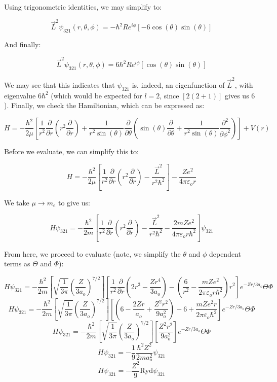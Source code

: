 \begin{enumerate}
    Using trigonometric identities, we may simplify to:

    $$\vec{L}^2\psi_{321}(r,\theta,\phi)=-\hbar^2Re^{i\phi}\left[ -6\cos(\theta)\sin(\theta)\right]$$

    And finally:

    $$\vec{L}^2\psi_{321}(r,\theta,\phi)=6\hbar^2Re^{i\phi}\left[ \cos(\theta)\sin(\theta)\right]$$
    
    We may see that this indicates that $\psi_{321}$ is, indeed, an eigenfunction of $\vec{L}^2$, with eigenvalue $6\hbar^2$ (which would be expected for $l=2$, since $[2(2+1)]$ gives us $6$). Finally, we check the Hamiltonian, which can be expressed as:

    $$H=-\frac{\hbar^2}{2\mu}\left[ \frac{1}{r^2}\frac{\partial}{\partial r}\left( r^2\frac{\partial}{\partial r} \right)+\frac{1}{r^2\sin(\theta)}\frac{\partial}{\partial \theta}\left( \sin(\theta)\frac{\partial}{\partial\theta}+\frac{1}{r^2\sin(\theta)}\frac{\partial^2}{\partial\phi^2} \right) \right] + V(r)$$

    Before we evaluate, we can simplify this to:

    $$H=-\frac{\hbar^2}{2\mu}\left[ \frac{1}{r^2}\frac{\partial}{\partial r}\left( r^2\frac{\partial}{\partial r}\right) -\frac{\vec{L}^2}{r^2\hbar^2}\right]-\frac{Ze^2}{4\pi\varepsilon_or}$$

    We take $\mu\to m_e$ to give us:

    $$H\psi_{321}=-\frac{\hbar^2}{2m}\left[ \frac{1}{r^2}\frac{\partial}{\partial r}\left( r^2\frac{\partial}{\partial r}\right) -\frac{\vec{L}^2}{r^2\hbar^2}-\frac{2mZe^2}{4\pi\varepsilon_or\hbar^2}\right]\psi_{321}$$

    From here, we proceed to evaluate (note, we simplify the $\theta$ and $\phi$ dependent terms as $\Theta$ and $\Phi$):

    $$H\psi_{321}=-\frac{\hbar^2}{2m}\left[ \sqrt{\frac{1}{3\pi}}\left( \frac{Z}{3a_o} \right)^{7/2}\right]\left[ \frac{1}{r^2}\frac{\partial}{\partial r}\left( 2r^3-\frac{Zr^4}{3a_o} \right)-\left( \frac{6}{r^2}-\frac{mZe^2}{2\pi\varepsilon_or\hbar^2} \right)r^2 \right]e^{-Zr/3a_o}\Theta\Phi$$
    $$H\psi_{321}=-\frac{\hbar^2}{2m}\left[ \sqrt{\frac{1}{3\pi}}\left( \frac{Z}{3a_o} \right)^{7/2}\right]\left[ \left( 6-\frac{2Zr}{a_o}+\frac{Z^2r^2}{9a_o^2} \right)-6+\frac{mZe^2r}{2\pi\varepsilon_o\hbar^2} \right]e^{-Zr/3a_o}\Theta\Phi$$
    $$H\psi_{321}=-\frac{\hbar^2}{2m}\left[ \sqrt{\frac{1}{3\pi}}\left( \frac{Z}{3a_o} \right)^{7/2}\right]\left[ \frac{Z^2r^2}{9a_o^2} \right]e^{-Zr/3a_o}\Theta\Phi$$
    $$H\psi_{321}=-\frac{1}{9}\frac{\hbar^2Z^2}{2ma_o^2}\psi_{321}$$
    $$\boxed{H\psi_{321}=-\frac{Z^2}{9}\text{Ryd}\psi_{321}}$$


\end{enumerate}
